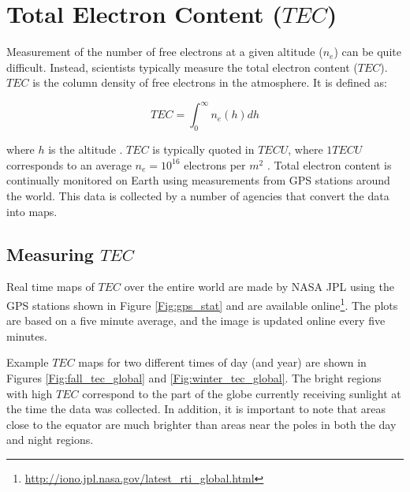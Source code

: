 \section{Total Electron Content ($TEC$)}

Measurement of the number of free electrons at a given altitude ($n_e$) can be quite difficult. Instead, scientists typically measure the total electron content ($TEC$). $TEC$ is the column density of free electrons in the atmosphere. It is defined as:

\begin{equation}
TEC = \int_0^\infty n_e (h) dh 
\end{equation}

where $h$ is the altitude \cite{thompson_2001}. $TEC$ is typically quoted in $TECU$, where $1 TECU$ corresponds to an average $n_e = 10^{16}$ electrons per $m^2$ \cite{vedantham_2014}. Total electron content is continually monitored on Earth using measurements from GPS stations around the world. This data is collected by a number of agencies that convert the data into maps. 


\subsection{Measuring $TEC$}

Real time maps of $TEC$ over the entire world are made by NASA JPL using the GPS stations shown in Figure \ref{Fig:gps_stat} and are available online\footnote{\url{http://iono.jpl.nasa.gov/latest_rti_global.html}}. The plots are based on a five minute average, and the image is updated online every five minutes. 

Example $TEC$ maps for two different times of day (and year) are shown in Figures \ref{Fig:fall_tec_global} and \ref{Fig:winter_tec_global}.  The bright regions with high $TEC$ correspond to the part of the globe currently receiving sunlight at the time the data was collected. In addition, it is important to note that areas close to the equator are much brighter than areas near the poles in both the day and night regions.

